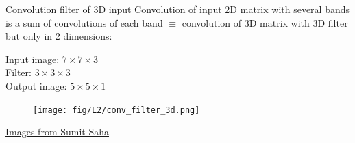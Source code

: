 \documentclass[handout]{beamer}
\begin{document}
\begin{frame}{Convolution filter of 3D input}
    Convolution of input 2D matrix with several bands is a sum of convolutions of each band $\equiv$ convolution of 3D matrix with 3D filter but only in 2 dimensions: \\
    \begin{tiny}
        Input image: $7 \times 7 \times 3$ \\
        Filter: $3 \times 3 \times 3$ \\
        Output image: $5 \times 5 \times 1$ \\
    \end{tiny}
    \begin{figure}
   \centering
    \texttt{[image: fig/L2/conv\_filter\_3d.png]}
\end{figure}
{\tiny \href{https://towardsdatascience.com/a-comprehensive-guide-to-convolutional-neural-networks-the-eli5-way-3bd2b1164a53}{ Images from Sumit Saha}}
\end{frame}
\end{document}
